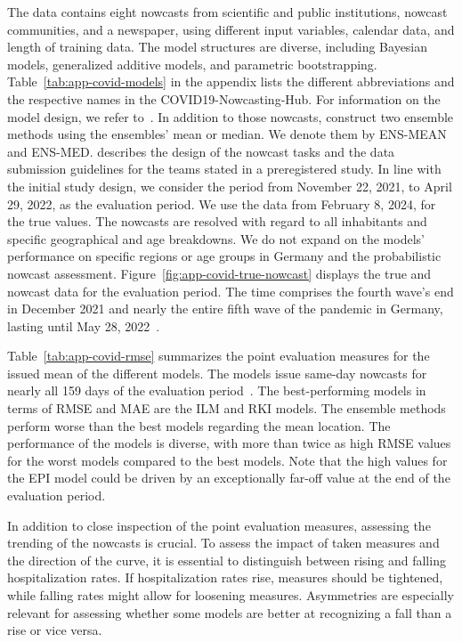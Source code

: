 \documentclass[pdflatex]{sn-jnl}
\theoremstyle{plain}%
\theoremstyle{definition}
\begin{document}
The data contains eight nowcasts from scientific and public institutions, nowcast communities, and a newspaper, using different input variables, calendar data, and length of training data.
The model structures are diverse, including Bayesian models, generalized additive models, and parametric bootstrapping.
Table~\ref{tab:app-covid-models} in the appendix lists the different abbreviations and the respective names in the COVID19-Nowcasting-Hub.
For information on the model design, we refer to~\citet{Wolffram2023}.
In addition to those nowcasts, \citet{Wolffram2023} construct two ensemble methods using the ensembles' mean or median.
We denote them by ENS-MEAN and ENS-MED.
\citet{Wolffram2023} describes the design of the nowcast tasks and the data submission guidelines for the teams stated in a preregistered study.
In line with the initial study design, we consider the period from November 22, 2021, to April 29, 2022, as the evaluation period.
We use the data from February 8, 2024, for the true values.
The nowcasts are resolved with regard to all inhabitants and specific geographical and age breakdowns.
We do not expand on the models' performance on specific regions or age groups in Germany and the probabilistic nowcast assessment.
Figure~\ref{fig:app-covid-true-nowcast} displays the true and nowcast data for the evaluation period.
The time comprises the fourth wave's end in December 2021 and nearly the entire fifth wave of the pandemic in Germany, lasting until May 28, 2022~\citep{Tolksdorf2022}.

Table~\ref{tab:app-covid-rmse} summarizes the point evaluation measures for the issued mean of the different models.
The models issue same-day nowcasts for nearly all 159 days of the evaluation period~\citep[for explanations of the missing values, see][Tables A2, A3, and A4]{Wolffram2023}.
The best-performing models in terms of RMSE and MAE are the ILM and RKI models.
The ensemble methods perform worse than the best models regarding the mean location.
The performance of the models is diverse, with more than twice as high RMSE values for the worst models compared to the best models.
Note that the high values for the EPI model could be driven by an exceptionally far-off value at the end of the evaluation period.

In addition to close inspection of the point evaluation measures, assessing the trending of the nowcasts is crucial.
To assess the impact of taken measures and the direction of the curve, it is essential to distinguish between rising and falling hospitalization rates.
If hospitalization rates rise, measures should be tightened, while falling rates might allow for loosening measures.
Asymmetries are especially relevant for assessing whether some models are better at recognizing a fall than a rise or vice versa.
\end{document}
